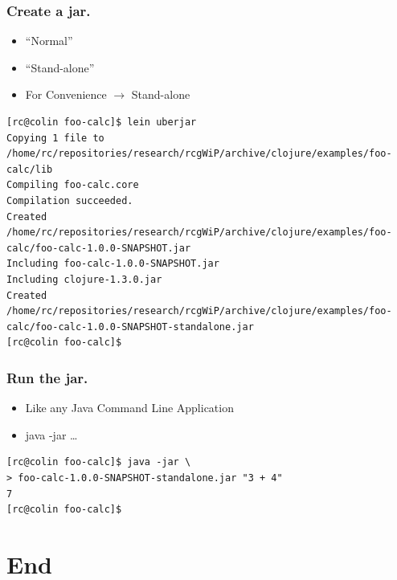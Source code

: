 \documentclass{beamer}
\begin{document}
\begin{frame}[fragile]
\frametitle{Create a jar.}
\begin{itemize}
\item ``Normal''
\item ``Stand-alone''
\item For Convenience $\rightarrow$ Stand-alone
\end{itemize}
\begin{lstlisting}[basicstyle=\scriptsize]
[rc@colin foo-calc]$ lein uberjar 
Copying 1 file to /home/rc/repositories/research/rcgWiP/archive/clojure/examples/foo-calc/lib
Compiling foo-calc.core
Compilation succeeded.
Created /home/rc/repositories/research/rcgWiP/archive/clojure/examples/foo-calc/foo-calc-1.0.0-SNAPSHOT.jar
Including foo-calc-1.0.0-SNAPSHOT.jar
Including clojure-1.3.0.jar
Created /home/rc/repositories/research/rcgWiP/archive/clojure/examples/foo-calc/foo-calc-1.0.0-SNAPSHOT-standalone.jar
[rc@colin foo-calc]$  
\end{lstlisting}
\end{frame}

\begin{frame}[fragile]
\frametitle{Run the jar.}
\begin{itemize}
\item Like any Java Command Line Application
\item java -jar \ldots
\end{itemize}
\begin{lstlisting}[basicstyle=\scriptsize]
[rc@colin foo-calc]$ java -jar \ 
> foo-calc-1.0.0-SNAPSHOT-standalone.jar "3 + 4" 
7
[rc@colin foo-calc]$  
\end{lstlisting}
\end{frame}

  \section{End}
  \subsection{}
  
\end{document}
